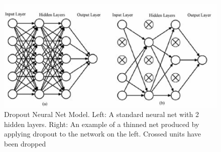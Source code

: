 \begin{figure}[htb] 
	\label{fig:dropout}
	\centering
	\includegraphics[width=\textwidth]{figures/dropout}
	\caption{Dropout Neural Net Model. Left: A standard neural net with 2 hidden layers.
	Right: An example of a thinned net produced by applying dropout to the network on the left.
	Crossed units have been dropped}
\end{figure}

